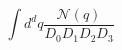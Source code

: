 \documentclass[10pt]{article}
\begin{document}
\[\int d^dq \frac{\mathcal{N}(q)}{D_0 D_1 D_2 D_3}\]
\]
\end{document}
